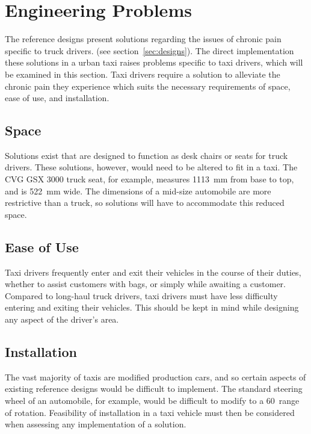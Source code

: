 \documentclass[11pt]{article}
\begin{document}
\section{Engineering Problems}
\label{sec:engprob}
The reference designs present solutions regarding the issues of chronic pain specific to truck drivers. 
(see section~\ref{sec:designs}). The direct implementation these solutions in a urban 
taxi raises problems specific to taxi drivers, which will be examined in this section. Taxi drivers 
require a solution to alleviate the chronic pain they experience which suits the necessary requirements of 
space, ease of use, and installation.


\subsection{Space}
\label{sec:space}

Solutions exist that are designed to function as desk chairs or seats for truck
drivers. These solutions, however, would need to be altered to fit in
a taxi. The CVG GSX 3000 truck seat, for example, measures 1113~mm from base
to top, and is 522~mm wide. The dimensions of a mid-size automobile
are more restrictive than a truck, so solutions will have to accommodate
this reduced space.

\subsection{Ease of Use}
\label{sec:ease}
Taxi drivers frequently enter and exit their vehicles in the course of
their duties, whether to assist customers with bags, or simply while awaiting
a customer. Compared to long-haul truck drivers, taxi drivers must have less
difficulty entering and exiting their vehicles. This should be kept in mind
while designing any aspect of the driver's area.
\subsection{Installation}
\label{sec:installation}

The vast majority of taxis are modified production cars, %
and so certain aspects of existing reference designs would be difficult to
implement. The standard steering wheel of an automobile, for example,
would be difficult to modify to a 60\textdegree~range of
rotation\cite{Ismail2003}. Feasibility of installation in a taxi vehicle must then
be considered when assessing any implementation of a solution.
\end{document}
